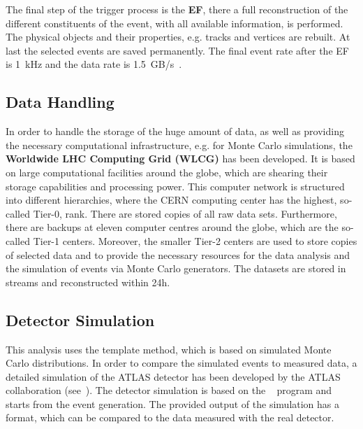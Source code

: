  The final step of the trigger process is the \textbf{EF}, there a full reconstruction of the different constituents of the event, with all available information, is performed. The physical objects and their properties, e.g.  tracks and vertices are rebuilt. At last the selected events are saved permanently. The final event rate after the EF is 1~kHz and the data rate is 1.5~GB/s~\cite{Nakahama:2015211}.






\subsection{Data Handling}

 In order to handle the storage of the huge amount of data, as well as providing the necessary computational infrastructure, e.g. for Monte Carlo simulations, the\textbf{ Worldwide LHC Computing Grid (WLCG)} has been developed. It is based on large computational facilities around the globe, which are shearing their storage capabilities and processing power. This computer network is structured into different hierarchies, where the CERN computing center has the highest, so-called  Tier-0,  rank. There are stored copies of all raw data sets. Furthermore, there are backups at eleven computer centres around the globe, which are the so-called Tier-1 centers. Moreover,  the smaller Tier-2 centers are used to store copies of selected data and to provide the necessary resources for the data analysis and the simulation of events via Monte Carlo generators. The datasets are stored in streams and reconstructed within 24h.


\subsection{Detector Simulation}
This analysis uses the template method, which is based on simulated Monte Carlo distributions. In order to compare the simulated events to measured data, a detailed simulation of the ATLAS detector has been developed by the ATLAS collaboration (see~\cite{Aad:2010ah}). 
The detector simulation is based on the ~\cite{Agostinelli:2002hh} program  and starts from the event generation. The provided output of the simulation has a format, which can be compared to the data measured with the real detector.  

